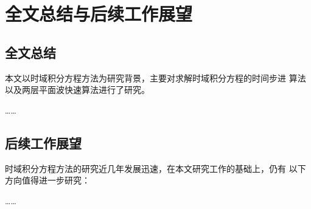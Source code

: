 
\chapter{全文总结与后续工作展望}

\section{全文总结}
本文以时域积分方程方法为研究背景，主要对求解时域积分方程的时间步进
算法以及两层平面波快速算法进行了研究。

……
\section{后续工作展望}
时域积分方程方法的研究近几年发展迅速，在本文研究工作的基础上，仍有
以下方向值得进一步研究：

……